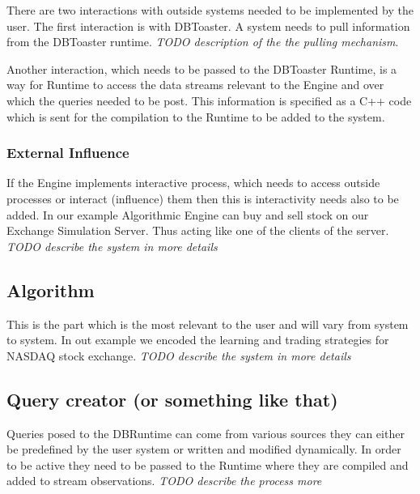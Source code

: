 \documentclass[11pt]{article}
\begin{document}
There are two interactions with outside systems needed to be implemented by the user. The first interaction is with DBToaster. A system needs to pull information from the DBToaster runtime. \emph{TODO description of the the pulling mechanism}.

Another interaction, which needs to be passed to the DBToaster Runtime, is a way for Runtime to access the data streams relevant to the Engine and over which the queries needed to be post. This information is specified as a C++ code which is sent for the compilation to the Runtime to be added to the system.

\subsubsection{External Influence}

If the Engine implements interactive process, which needs to access outside processes or interact (influence) them then this is interactivity needs also to be added. In our example Algorithmic Engine can buy and sell stock on our Exchange Simulation Server. Thus acting like one of the clients of the server. \emph{TODO describe the system in more details}

\subsection{Algorithm}

This is the part which is the most relevant to the user and will vary from system to system. In out example we encoded the learning and trading strategies for NASDAQ stock exchange. \emph{TODO describe the system in more details}

\subsection{Query creator (or something like that)}

Queries posed to the DBRuntime can come from various sources they can either be predefined by the user system or written and modified dynamically. In order to be active they need to be passed to the Runtime where they are compiled and added to stream observations. \emph{TODO describe the process more}
\end{document}
